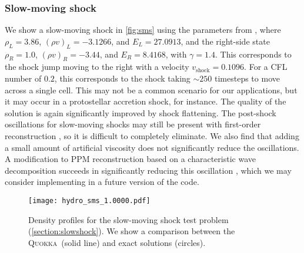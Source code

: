 \documentclass[fleqn,usenatbib]{mnras}
\newcommand{\quokka}{\textsc{Quokka}}
\begin{document}
\subsubsection{Slow-moving shock}
\label{section:slowshock}
We show a slow-moving shock in \autoref{fig:sms} using the parameters from \cite{Jin_1996}, where $\rho_L = 3.86$, $(\rho v)_L = -3.1266$, and $E_L = 27.0913$, and the right-side state $\rho_R = 1.0$, $(\rho v)_R = -3.44$, and $E_R = 8.4168$, with $\gamma = 1.4$. This corresponds to the shock jump moving to the right with a velocity $v_{\text{shock}} = 0.1096$. For a CFL number of $0.2$, this corresponds to the shock taking $\sim 250$ timesteps to move across a single cell. This may not be a common scenario for our applications, but it may occur in a protostellar accretion shock, for instance. The quality of the solution is again significantly improved by shock flattening. The post-shock oscillations for slow-moving shocks may still be present with first-order reconstruction \citep{Jin_1996,Lee_2011}, so it is difficult to completely eliminate. We also find that adding a small amount of artificial viscosity does not significantly reduce the oscillations. A modification to PPM reconstruction based on a characteristic wave decomposition succeeds in significantly reducing this oscillation \citep{Lee_2011}, which we may consider implementing in a future version of the code.
\begin{figure}
    \texttt{[image: hydro\_sms\_1.0000.pdf]}
    \caption{Density profiles for the slow-moving shock test problem (\autoref{section:slowshock}). We show a comparison between the \quokka~(solid line) and exact solutions (circles).}
    \label{fig:sms}
\end{figure}
\end{document}
